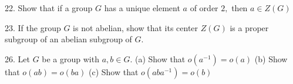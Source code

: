 \begin{mdframed}[style=darkAnswer,frametitle={Joe Starr}]

\end{mdframed}
\newpage
\begin{mdframed}[style=darkQuesion]
22. Show that if a group $G$ has a unique element $a$ of order $2,$ then $a \in Z(G)$

\end{mdframed}

\begin{mdframed}[style=darkAnswer,frametitle={Joe Starr}]

\end{mdframed}
\newpage
\begin{mdframed}[style=darkQuesion]
23. If the group $G$ is not abelian, show that its center $Z(G)$ is a proper subgroup of an abelian subgroup of $G .$

\end{mdframed}

\begin{mdframed}[style=darkAnswer,frametitle={Joe Starr}]

\end{mdframed}
\newpage
\begin{mdframed}[style=darkQuesion]
26. Let $G$ be a group with $a, b \in G$.
(a) Show that $o\left(a^{-1}\right)=o(a)$
(b) Show that $o(a b)=o(b a)$
(c) Show that $o\left(a b a^{-1}\right)=o(b)$

\end{mdframed}

